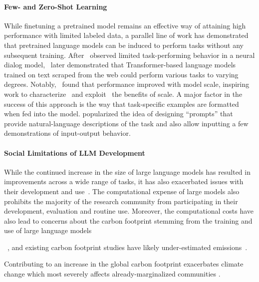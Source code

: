 \paragraph{Few- and Zero-Shot Learning} While finetuning a pretrained model remains an effective way of attaining high performance with limited labeled data, a parallel line of work has demonstrated that pretrained language models can be induced to perform tasks without any subsequent training.
After~\citet{vinyals2015neural} observed limited task-performing behavior in a neural dialog model,~\citet{radford2019language} later demonstrated that Transformer-based language models trained on text scraped from the web could perform various tasks to varying degrees.
Notably,~\citet{radford2019language} found that performance improved with model scale, inspiring work to characterize~\citep{kaplan2020scaling,hoffmann2022training} and exploit~\citep{shoeybi2019megatron,brown2020language,smith2022using,chowdhery2022palm,rae2021scaling,wang2021ernie,zeng2021pangu,zhang2022opt} the benefits of scale. A major factor in the success of this approach is the way that task-specific examples are formatted when fed into the model.
\citet{brown2020language} popularized the idea of designing ``prompts'' that provide natural-language descriptions of the task and also allow inputting a few demonstrations of input-output behavior.

\paragraph{Social Limitations of LLM Development} While the continued increase in the size of large language models has resulted in improvements across a wide range of tasks, it has also exacerbated issues with their development and use~\citep{bender2021dangers}. The computational expense of large models also prohibits the majority of the research community from participating in their development, evaluation and routine use. Moreover, the computational costs have also lead to concerns about the carbon footprint stemming from the training and use of large language models

~\citep{strubell2019energy,lacoste2019quantifying,schwartz2020green,bannour-etal-2021-evaluating}, and existing carbon footprint studies have likely under-estimated emissions~\citep{bannour-etal-2021-evaluating}. 

Contributing to an increase in the global carbon footprint exacerbates climate change which most severely affects already-marginalized communities \citep{westra2001faces}.


